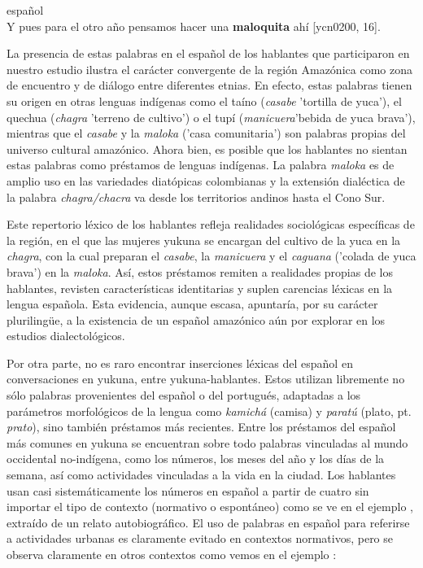 \documentclass[output=paper]{langscibook}
\begin{document}
\ea\label{ex:lemus:6}
{español}\\
 Y pues para el otro año pensamos hacer una \textbf{maloquita} ahí {[ycn0200, 16]}.
\z

La presencia de estas palabras en el español de los hablantes que participaron en nuestro estudio ilustra el carácter convergente de la región Amazónica como zona de encuentro y de diálogo entre diferentes etnias. En efecto, estas palabras tienen su origen en otras lenguas indígenas como el taíno (\textit{casabe} 'tortilla de yuca'), el quechua (\textit{chagra} 'terreno de cultivo') o el tupí (\textit{manicuera}'bebida de yuca brava'), mientras que el \textit{casabe} y la \textit{maloka} ('casa comunitaria') son palabras propias del universo cultural amazónico. Ahora bien, es posible que los hablantes no sientan estas palabras como préstamos de lenguas indígenas. La palabra \textit{maloka} es de amplio uso en las variedades diatópicas colombianas y la extensión dialéctica de la palabra \textit{chagra/chacra} va desde los territorios andinos hasta el Cono Sur.

Este repertorio léxico de los hablantes refleja realidades sociológicas específicas de la región, en el que las mujeres yukuna se encargan del cultivo de la yuca en la \textit{chagra}, con la cual preparan el \textit{casabe}, la \textit{manicuera} y el \textit{caguana} ('colada de yuca brava') en la \textit{maloka}. Así, estos préstamos remiten a realidades propias de los hablantes, revisten características identitarias y suplen carencias léxicas en la lengua española. Esta evidencia, aunque escasa, apuntaría, por su carácter plurilingüe, a la existencia de un español amazónico aún por explorar en los estudios dialectológicos. 

Por otra parte, no es raro encontrar inserciones léxicas del español en conversaciones en yukuna, entre yukuna-hablantes. Estos utilizan libremente no sólo palabras provenientes del español o del portugués, adaptadas a los parámetros morfológicos de la lengua como \textit{kamichá} (camisa) y \textit{paratú} (plato, pt. \textit{prato}), sino también préstamos más recientes. Entre los préstamos del español más comunes en yukuna se encuentran sobre todo palabras vinculadas al mundo occidental no-indígena, como los números, los meses del año y los días de la semana, así como actividades vinculadas a la vida en la ciudad. Los hablantes usan casi sistemáticamente los números en español a partir de cuatro sin importar el tipo de contexto (normativo o espontáneo) como se ve en el ejemplo , extraído de un relato autobiográfico. El uso de palabras en español para referirse a actividades urbanas es claramente evitado en contextos normativos, pero se observa claramente en otros contextos como vemos en el ejemplo :
\end{document}
